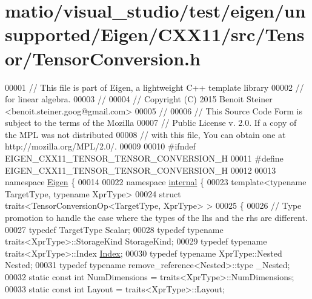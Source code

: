 \hypertarget{matio_2visual__studio_2test_2eigen_2unsupported_2_eigen_2_c_x_x11_2src_2_tensor_2_tensor_conversion_8h_source}{}\section{matio/visual\+\_\+studio/test/eigen/unsupported/\+Eigen/\+C\+X\+X11/src/\+Tensor/\+Tensor\+Conversion.h}
\label{matio_2visual__studio_2test_2eigen_2unsupported_2_eigen_2_c_x_x11_2src_2_tensor_2_tensor_conversion_8h_source}

\begin{DoxyCode}
00001 \textcolor{comment}{// This file is part of Eigen, a lightweight C++ template library}
00002 \textcolor{comment}{// for linear algebra.}
00003 \textcolor{comment}{//}
00004 \textcolor{comment}{// Copyright (C) 2015 Benoit Steiner <benoit.steiner.goog@gmail.com>}
00005 \textcolor{comment}{//}
00006 \textcolor{comment}{// This Source Code Form is subject to the terms of the Mozilla}
00007 \textcolor{comment}{// Public License v. 2.0. If a copy of the MPL was not distributed}
00008 \textcolor{comment}{// with this file, You can obtain one at http://mozilla.org/MPL/2.0/.}
00009 
00010 \textcolor{preprocessor}{#ifndef EIGEN\_CXX11\_TENSOR\_TENSOR\_CONVERSION\_H}
00011 \textcolor{preprocessor}{#define EIGEN\_CXX11\_TENSOR\_TENSOR\_CONVERSION\_H}
00012 
00013 \textcolor{keyword}{namespace }\hyperlink{namespace_eigen}{Eigen} \{
00014 
00022 \textcolor{keyword}{namespace }\hyperlink{namespaceinternal}{internal} \{
00023 \textcolor{keyword}{template}<\textcolor{keyword}{typename} TargetType, \textcolor{keyword}{typename} XprType>
00024 \textcolor{keyword}{struct }traits<TensorConversionOp<TargetType, XprType> >
00025 \{
00026   \textcolor{comment}{// Type promotion to handle the case where the types of the lhs and the rhs are different.}
00027   \textcolor{keyword}{typedef} TargetType Scalar;
00028   \textcolor{keyword}{typedef} \textcolor{keyword}{typename} traits<XprType>::StorageKind StorageKind;
00029   \textcolor{keyword}{typedef} \textcolor{keyword}{typename} traits<XprType>::Index \hyperlink{namespace_eigen_a62e77e0933482dafde8fe197d9a2cfde}{Index};
00030   \textcolor{keyword}{typedef} \textcolor{keyword}{typename} XprType::Nested Nested;
00031   \textcolor{keyword}{typedef} \textcolor{keyword}{typename} remove\_reference<Nested>::type \_Nested;
00032   \textcolor{keyword}{static} \textcolor{keyword}{const} \textcolor{keywordtype}{int} NumDimensions = traits<XprType>::NumDimensions;
00033   \textcolor{keyword}{static} \textcolor{keyword}{const} \textcolor{keywordtype}{int} Layout = traits<XprType>::Layout;

\end{DoxyCode}
